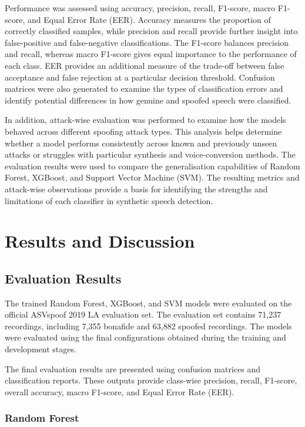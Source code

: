 \documentclass[12pt,a4paper]{report}
\begin{document}
Performance was assessed using accuracy, precision, recall, F1-score, macro F1-score, and Equal Error Rate (EER). Accuracy measures the proportion of correctly classified samples, while precision and recall provide further insight into false-positive and false-negative classifications. The F1-score balances precision and recall, whereas macro F1-score gives equal importance to the performance of each class. EER provides an additional measure of the trade-off between false acceptance and false rejection at a particular decision threshold. Confusion matrices were also generated to examine the types of classification errors and identify potential differences in how genuine and spoofed speech were classified.

In addition, attack-wise evaluation was performed to examine how the models behaved across different spoofing attack types. This analysis helps determine whether a model performs consistently across known and previously unseen attacks or struggles with particular synthesis and voice-conversion methods. The evaluation results were used to compare the generalisation capabilities of Random Forest, XGBoost, and Support Vector Machine (SVM). The resulting metrics and attack-wise observations provide a basis for identifying the strengths and limitations of each classifier in synthetic speech detection.

\chapter{Results and Discussion}

\section{Evaluation Results}

The trained Random Forest, XGBoost, and SVM models were evaluated on the official ASVspoof 2019 LA evaluation set. The evaluation set contains 71,237 recordings, including 7,355 bonafide and 63,882 spoofed recordings. The models were evaluated using the final configurations obtained during the training and development stages.

The final evaluation results are presented using confusion matrices and classification reports. These outputs provide class-wise precision, recall, F1-score, overall accuracy, macro F1-score, and Equal Error Rate (EER).

\subsection{Random Forest}
\end{document}

